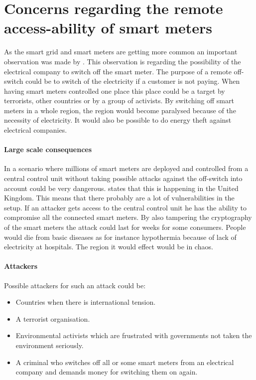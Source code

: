 
\section{Concerns regarding the remote access-ability of smart meters}\label{off_switch}
As the smart grid and smart meters are getting more common an important observation was made by \citet{offswitch}.
This observation is regarding the possibility of the electrical company to switch off the smart meter.
The purpose of a remote off-switch could be to switch of the electricity if a customer is not paying.
When having smart meters controlled one place this place could be a target by terrorists, other countries or by a group of activists. 
By switching off smart meters in a whole region, the region would become paralysed because of the necessity of electricity.
It would also be possible to do energy theft against electrical companies.

\paragraph{Large scale consequences}
In a scenario where millions of smart meters are deployed and controlled from a central control unit without taking possible attacks against the off-switch into account could be very dangerous.
\citet{offswitch} states that this is happening in the United Kingdom.
This means that there probably are a lot of vulnerabilities in the setup.
If an attacker gets access to the central control unit he has the ability to compromise all the connected smart meters.
By also tampering the cryptography of the smart meters the attack could last for weeks for some consumers.
People would die from basic diseases as for instance hypothermia because of lack of electricity at hospitals.
The region it would effect would be in chaos.

\paragraph{Attackers}
Possible attackers for such an attack could be:
\begin{itemize}
\item Countries when there is international tension.
\item A terrorist organisation.
\item Environmental activists which are frustrated with governments not taken the environment seriously.
\item A criminal who switches off all or some smart meters from an electrical company and demands money for switching them on again.
\end{itemize}

